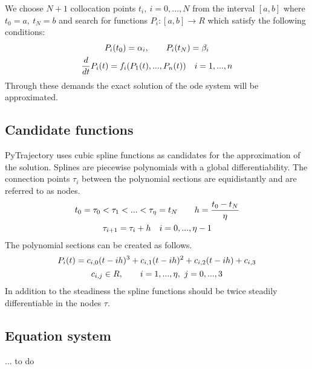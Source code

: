 \documentclass[letterpaper,10pt,english]{sphinxmanual}
\begin{document}
We choose \(N+1\) collocation points \(t_i,\ i = 0,...,N\) from the interval
\([a, b]\) where \(t_0 = a,\ t_{N} = b\) and search for functions
\(P_i:[a,b] \rightarrow R\) which satisfy the following conditions:
\begin{gather}
\begin{split}P_i(t_0) = \alpha_i, \qquad P_i(t_N) = \beta_i\end{split}\notag\\\begin{split}\frac{d}{d t} P_i(t) = f_i(P_1(t),...,P_n(t)) \quad i = 1,...,n\end{split}\notag
\end{gather}
Through these demands the exact solution of the ode system will be approximated.


\subsection{Candidate functions}
\label{guide/background:candidate-functions}
PyTrajectory uses cubic spline functions as candidates for the approximation of the
solution. Splines are piecewise polynomials with a global differentiability.
The connection points \(\tau_i\) between the polynomial sections are equidistantly
and are referred to as nodes.
\begin{gather}
\begin{split}t_0 = \tau_0 < \tau_1 < ... < \tau_{\eta} = t_N \qquad h = \frac{t_0 - t_N}{\eta}\end{split}\notag\\\begin{split}\tau_{i+1} = \tau_i + h \quad i = 0,...,\eta-1\end{split}\notag
\end{gather}
The polynomial sections can be created as follows.
\begin{gather}
\begin{split}P_i(t) = c_{i,0}(t-i h)^3 + c_{i,1}(t-i h)^2 + c_{i,2}(t-i h) + c_{i,3}\end{split}\notag\\\begin{split}c_{i,j} \in R,\qquad i = 1,...,\eta,\ j = 0,...,3\end{split}\notag
\end{gather}
In addition to the steadiness the spline functions should be twice steadily differentiable in
the nodes \(\tau\).


\subsection{Equation system}
\label{guide/background:equation-system}
... to do
\end{document}
